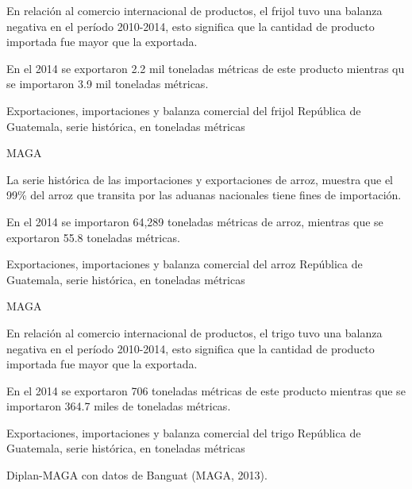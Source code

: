 %
{%
En relación al comercio internacional de productos, el frijol tuvo una balanza negativa en el período 2010-2014, esto significa que la cantidad de producto importada fue mayor que la exportada.

En el 2014 se exportaron 2.2 mil toneladas métricas de este producto mientras qu se importaron 3.9 mil toneladas métricas.}%
{%
	Exportaciones, importaciones y balanza comercial del frijol} %
{%
	República de Guatemala, serie histórica, en toneladas métricas } %
{%
	\begin{tikzpicture}[x=1pt,y=1pt]    \end{tikzpicture}}%
{%
	MAGA} %



%
{%
	La serie histórica de las importaciones y exportaciones de arroz, muestra que el 99\% del arroz que transita por las aduanas nacionales tiene fines de importación.
	
	En el 2014 se importaron 64,289 toneladas métricas de arroz, mientras que se exportaron 55.8 toneladas métricas. 
}%
{%
	Exportaciones, importaciones y balanza comercial del arroz} %
{%
	República de Guatemala, serie histórica, en toneladas métricas } %
{%
	\begin{tikzpicture}[x=1pt,y=1pt]    \end{tikzpicture}}%
{%
	MAGA} %


%
{%
	En relación al comercio internacional de productos, el trigo tuvo una balanza negativa en el período 2010-2014, esto significa que la cantidad de producto importada fue mayor que la exportada.
	
	En el 2014 se exportaron 706 toneladas métricas de este producto mientras que se importaron 364.7 miles de toneladas métricas.
}%
{%
	Exportaciones, importaciones y balanza comercial del trigo} %
{%
	República de Guatemala, serie histórica, en toneladas métricas } %
{%
	\begin{tikzpicture}[x=1pt,y=1pt]    \end{tikzpicture}}%
{%
	Diplan-MAGA con datos de Banguat (MAGA, 2013).} %


